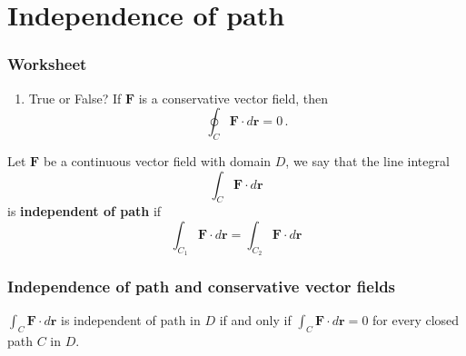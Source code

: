 \documentclass[aspectratio=169]{beamer}
\begin{document}
\section{Independence of path}
\begin{frame}
    \frametitle{Worksheet}
    \begin{enumerate}
        \item True or False? 
If \(\mathbf{F}\) is a conservative vector field, then
\begin{equation*}
    \oint_C \mathbf{F} \cdot d\mathbf{r} = 0 \,.
\end{equation*}
    \end{enumerate}

    \item 

\end{frame}

\begin{frame}
\begin{definition}
Let \(\mathbf{F}\) be a continuous vector field with domain \(D\), we say that the
line integral
\begin{equation*}
    \int_C \mathbf{F} \cdot d\mathbf{r} 
\end{equation*}
is \textbf{independent of path} if
\begin{equation*}
    \int_{C_1} \mathbf{F}\cdot d\mathbf{r} 
    =
    \int_{C_2} \mathbf{F} \cdot d\mathbf{r} 
\end{equation*}
\end{definition}
\end{frame}

\begin{frame}
    \frametitle{Independence of path and conservative vector fields}
    \begin{theorem}
    \(\int_C \mathbf{F}\cdot d\mathbf{r}\) is independent of path in \(D\) if and only if
    \(\int_C \mathbf{F} \cdot d\mathbf{r} = 0\) for every closed path \(C\) in \(D\).
    \end{theorem}
\end{frame}
\end{document}

